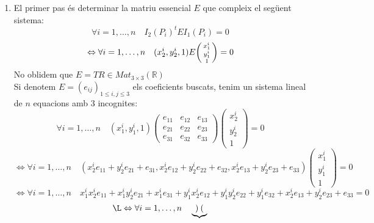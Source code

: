 \documentclass[../main.tex]{subfiles}
\begin{document}
	\begin{enumerate}
		\item El primer pas és determinar la matriu essencial $E$ que compleix el següent sistema:
		\begin{displaymath}
			\forall i = 1, \dots, n\quad I_2(P_i)^tEI_1(P_i) = 0
		\end{displaymath}
		\begin{displaymath}
			\Leftrightarrow \forall i = 1, \dots, n\quad (x_2^i, y_2^i, 1)E\begin{psmallmatrix}x_1^i\\y_1^i\\1\end{psmallmatrix} = 0
		\end{displaymath}
		No oblidem que $E = \hat{T}R \in Mat_{3\times3}(\mathbb{R})$\\
		Si denotem $E = (e_{ij})_{1 \leq i, j \leq 3}$ els coeficients buscats, tenim un sistema lineal de $n$ equacions amb $3$ incognites:
		\begin{displaymath}
			\forall i = 1, \dots, n\quad (x_1^i, y_1^i, 1)\begin{pmatrix}e_{11}&e_{12}&e_{13}\\e_{21}&e_{22}&e_{23}\\e_{31}&e_{32}&e_{33}\end{pmatrix}\begin{pmatrix}x_2^i\\y_2^i\\1\end{pmatrix} = 0
		\end{displaymath}
		\begin{displaymath}
			\Leftrightarrow \forall i = 1, \dots, n\quad (x_2^i e_{11}+y_2^ie_{21}+e_{31}, x_2^i e_{12}+y_2^ie_{22}+e_{32}, x_2^i e_{13}+y_2^ie_{23}+e_{33})\begin{pmatrix}x_1^i\\y_1^i\\1\end{pmatrix} = 0
		\end{displaymath}
		\begin{displaymath}
			\Leftrightarrow \forall i = 1, \dots, n\quad x_1^ix_2^ie_11+x_1^iy_2^ie_{21}+x_1^ie_{31}+y_1^ix_2^ie_{12}+y_1^iy_2^ie_{22}+y_1^ie_{32}+x_2^ie_{13}+y_2^ie_{23}+e_{33} = 0
		\end{displaymath}
		\begin{displaymath}
				\L\Leftrightarrow \forall i = 1, \dots, n\quad \underbrace{\begin{pmatrix}

\end{pmatrix}}
\end{displaymath}
\end{enumerate}
\end{document}
